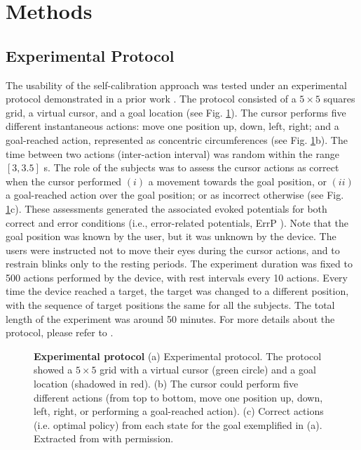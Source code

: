 
\section{Methods}
\label{sec:methods}

\subsection{Experimental Protocol}

The usability of the self-calibration approach was tested under an experimental protocol demonstrated in a prior work \cite{iturrate13}. The protocol consisted of a $5\times5$ squares grid, a virtual cursor, and a goal location (see Fig. \ref{fig:protocol}). The cursor performs five different instantaneous actions: move one position up, down, left, right; and a goal-reached action, represented as concentric circumferences (see Fig. \ref{fig:protocol}b). The time between two actions (inter-action interval) was random within the range $[3, 3.5]$ s. The role of the subjects was to assess the cursor actions as correct when the cursor performed $(i)$ a movement towards the goal position, or $(ii)$ a goal-reached action over the goal position; or as incorrect otherwise (see Fig. \ref{fig:protocol}c). These assessments generated the associated evoked potentials for both correct and error conditions (i.e., error-related potentials, ErrP \cite{chavarriaga2014errare}). Note that the goal position was known by the user, but it was unknown by the device. The users were instructed not to move their eyes during the cursor actions, and to restrain blinks only to the resting periods. The experiment duration was fixed to 500 actions performed by the device, with rest intervals every 10 actions. Every time the device reached a target, the target was changed to a different position, with the sequence of target positions the same for all the subjects. The total length of the experiment was around 50 minutes. For more details about the protocol, please refer to \cite{iturrate13}.

\begin{figure}[!tbp]
\centering
\caption{\label{fig:protocol} \textbf{Experimental protocol} (a) Experimental protocol. The protocol showed a $5\times5$ grid with a virtual cursor (green circle) and a goal location (shadowed in red). (b) The cursor could perform five different actions (from top to bottom, move one position up, down, left, right, or performing a goal-reached action). (c) Correct actions (i.e. optimal policy) from each state for the goal exemplified in (a). Extracted from \cite{iturrate13} with permission.}
\end{figure}



